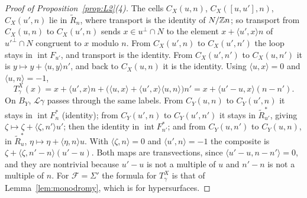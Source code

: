 \begin{proof}[Proof of Proposition~\ref{prop:L2}(4)]
The cells $C_X(u,n)$, $C_X([u,u'],n)$, $C_X(u',n)$ lie in $\widetilde R_n$, where transport is the identity of $N/\mathbb Z n$; so
transport from $C_X(u,n)$ to $C_X(u',n)$ sends $x\in u^\perp\cap N$ to the element $x+\langle u',x\rangle n$ of
$u'^\perp\cap N$ congruent to $x$ modulo $n$. From $C_X(u',n)$ to $C_X(u',n')$ the loop stays in $\operatorname{int}F_{u'}$,
and transport is the identity. From $C_X(u',n')$ to $C_X(u,n')$ it is $y\mapsto y+\langle u,y\rangle n'$, and back to
$C_X(u,n)$ it is the identity. Using $\langle u,x\rangle=0$ and $\langle u,n\rangle=-1$,
\[
T^X_\gamma(x)=x+\langle u',x\rangle n+\bigl(\langle u,x\rangle+\langle u',x\rangle\langle u,n\rangle\bigr)n'
=x+\langle u'-u,x\rangle(n-n').
\]
On $B_Y$, $\mathcal L\gamma$ passes through the same labels. From $C_Y(u,n)$ to $C_Y(u',n)$ it stays in
$\operatorname{int}F^*_n$ (identity); from $C_Y(u',n)$ to $C_Y(u',n')$ it stays in $\widetilde R^*_{u'}$, giving
$\zeta\mapsto\zeta+\langle\zeta,n'\rangle u'$; then the identity in $\operatorname{int}F^*_{n'}$; and from $C_Y(u,n')$ to
$C_Y(u,n)$, in $\widetilde R^*_u$, $\eta\mapsto\eta+\langle\eta,n\rangle u$. With $\langle\zeta,n\rangle=0$ and
$\langle u',n\rangle=-1$ the composite is $\zeta+\langle\zeta,n'-n\rangle(u'-u)$. Both maps are transvections, since
$\langle u'-u,n-n'\rangle=0$, and they are nontrivial because $u'-u$ is not a multiple of $u$ and $n'-n$ is not a multiple
of $n$. For $\mathcal F=\Sigma'$ the formula for $T^X_\gamma$ is that of Lemma~\ref{lem:monodromy}, which is
\cite[Prop.~3.15]{Gross2005} for hypersurfaces.
\end{proof}

